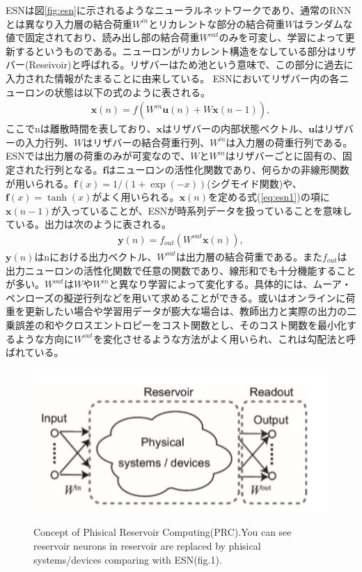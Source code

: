 \documentclass[a4j, twocolumn]{jsarticle}
\begin{document}
ESNは図\ref{fig:esn}に示されるようなニューラルネットワークであり、通常のRNNとは異なり入力層の結合荷重$W^{in}$とリカレントな部分の結合荷重$W$はランダムな値で固定されており、読み出し部の結合荷重$W^{out}$のみを可変し、学習によって更新するというものである。ニューロンがリカレント構造をなしている部分はリザバー(Reseivoir)と呼ばれる。リザバーはため池という意味で、この部分に過去に入力された情報がたまることに由来している。
ESNにおいてリザバー内の各ニューロンの状態は以下の式のように表される。
\begin{eqnarray}
\label{eq:esn1}
	\mathbf{x}(n) = {f}(W^{in}\mathbf{u}(n) + W\mathbf{x}(n-1)),
\end{eqnarray}
ここでnは離散時間を表しており、$\mathbf{x}$はリザバーの内部状態ベクトル、$\mathbf{u}$はリザバーの入力行列、$W$はリザバーの結合荷重行列、$W^{in}$は入力層の荷重行列である。ESNでは出力層の荷重のみが可変なので、$W$と$W^{in}$はリザバーごとに固有の、固定された行列となる。$\mathbf{f}$はニューロンの活性化関数であり、何らかの非線形関数が用いられる。$\mathbf{f}(x) = 1/(1 + \exp(-x))$(シグモイド関数)や、$\mathbf{f}(x) = \tanh(x)$がよく用いられる。$\mathbf{x}(n)$を定める式(\ref{eq:esn1})の項に$\mathbf{x}(n-1)$が入っていることが、ESNが時系列データを扱っていることを意味している。出力は次のように表される。
\begin{eqnarray}
\label{eq:esn2}
	\mathbf{y}(n) = {f_{out}}(W^{out}\mathbf{x}(n)),
\end{eqnarray}
$\mathbf{y}(n)$はnにおける出力ベクトル、$W^{out}$は出力層の結合荷重である。また$f_{out}$は出力ニューロンの活性化関数で任意の関数であり、線形和でも十分機能することが多い。$W^{out}$は$W$や$W^{in}$と異なり学習によって変化する。具体的には、ムーア・ペンローズの擬逆行列などを用いて求めることができる。或いはオンラインに荷重を更新したい場合や学習用データが膨大な場合は、教師出力と実際の出力の二乗誤差の和やクロスエントロピーをコスト関数とし、そのコスト関数を最小化するような方向に$W^{out}$を変化させるような方法がよく用いられ、これは勾配法と呼ばれている。

\begin{figure}
\centering
\includegraphics[width=1\hsize]{./figures/phisicalrc2}\\
\caption{Concept of Phisical Reservoir Computing(PRC)\cite{tanaka2018recent}.You can see reservoir neurons in reservoir are replaced by phisical systems/devices comparing with ESN(fig.1).}
\label{fig:prc}
\end{figure}
\end{document}
